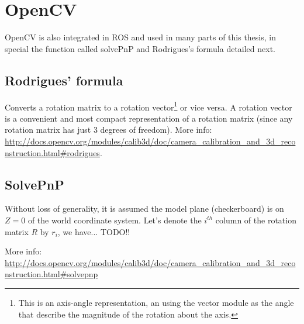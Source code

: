 \section{OpenCV}

OpenCV is also integrated in ROS and used in many parts of this thesis, in special the function called solvePnP and Rodrigues's formula detailed next.


\subsection{Rodrigues' formula}

Converts a rotation matrix to a rotation vector\footnote{This is an axis-angle representation, an using the vector module as the angle that describe the magnitude of the rotation about the axis.} or vice versa. A rotation vector is a convenient and most compact representation of a rotation matrix (since any rotation matrix has just 3 degrees of freedom). More info: \url{http://docs.opencv.org/modules/calib3d/doc/camera_calibration_and_3d_reconstruction.html#rodrigues}.



\subsection{SolvePnP}
\label{sec:solvePnP}

Without loss of generality, it is assumed the model plane (checkerboard) is on $Z=0$ of the world coordinate system. Let's denote the $i^{th}$ column of the rotation matrix $R$ by $r_i$, we have... TODO!!

More info: \url{http://docs.opencv.org/modules/calib3d/doc/camera_calibration_and_3d_reconstruction.html#solvepnp}


%
%
%
%





